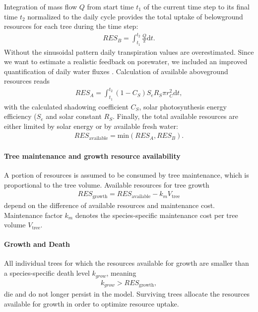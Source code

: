 Integration of mass flow $Q$ from start time $t_1$ of the current time step to its final time $t_2$ normalized to the daily cycle provides the total uptake of belowground resources for each tree during the time step:
\begin{align}
RES_B = \int_{t_1}^{t_2} \frac{Q}{\pi} \mathrm{d}t.
\end{align}
Without the sinusoidal pattern daily transpiration values are overestimated. Since we want to estimate a realistic feedback on porewater, we included an improved quantification of daily water fluxes \citep{Peters2020}.
Calculation of available aboveground resources reads
\begin{align}
RES_A = \int_{t_1}^{t_2} (1-C_S) S_e R_S \pi r_C^2 \mathrm{d}t,
\end{align}
with the calculated shadowing coefficient $C_S$, solar photosynthesis energy efficiency ($S_e$ and solar constant $R_S$.
Finally, the total available resources are either limited by solar energy or by available fresh water:
\begin{align}
RES_{\text{available}} = \text{min}\left(RES_A, RES_B\right).
\end{align}
\paragraph{\textbf{Tree maintenance and growth resource availability}}
A portion of resources is assumed to be consumed by tree maintenance, which is proportional to the tree volume.
Available resources for tree growth
\begin{align}
RES_{\text{growth}} = RES_{\text{available}} - k_m V_{\text{tree}}
\end{align}
depend on the difference of available resources and maintenance cost.
Maintenance factor $k_m$ denotes the species-specific maintenance cost per tree volume $V_{\text{tree}}$.
\paragraph{\textbf{Growth and Death}}
All individual trees for which the resources available for growth are smaller than a species-specific death level $k_{grow}$, meaning
\begin{align}
k_{grow} > RES_{\text{growth}},
\end{align}
die and do not longer persist in the model.
Surviving trees allocate the resources available for growth in order to optimize resource uptake.

